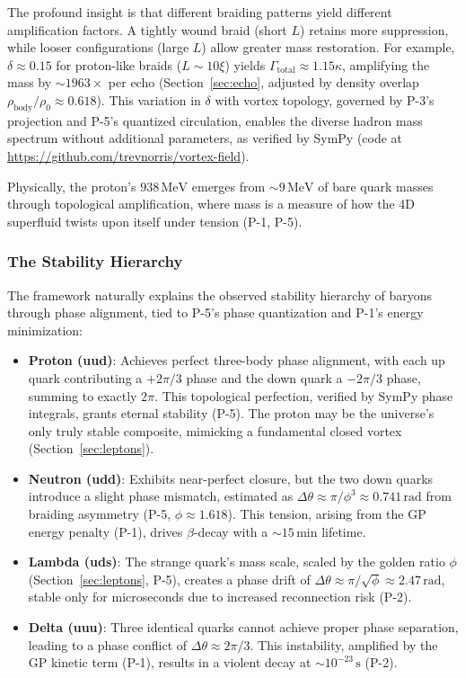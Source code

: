 The profound insight is that different braiding patterns yield different amplification factors. A tightly wound braid (short $L$) retains more suppression, while looser configurations (large $L$) allow greater mass restoration. For example, $\delta \approx 0.15$ for proton-like braids ($L \sim 10 \xi$) yields $\Gamma_{\text{total}} \approx 1.15 \kappa$, amplifying the mass by $\sim 1963\times$ per echo (Section~\ref{sec:echo}, adjusted by density overlap $\rho_{\text{body}} / \rho_0 \approx 0.618$). This variation in $\delta$ with vortex topology, governed by P-3's projection and P-5's quantized circulation, enables the diverse hadron mass spectrum without additional parameters, as verified by SymPy (code at \url{https://github.com/trevnorris/vortex-field}).

Physically, the proton's $938 \, \text{MeV}$ emerges from $\sim 9 \, \text{MeV}$ of bare quark masses through topological amplification, where mass is a measure of how the 4D superfluid twists upon itself under tension (P-1, P-5).

\subsubsection{The Stability Hierarchy}

The framework naturally explains the observed stability hierarchy of baryons through phase alignment, tied to P-5's phase quantization and P-1's energy minimization:

\begin{itemize}
\item \textbf{Proton (uud)}: Achieves perfect three-body phase alignment, with each up quark contributing a $+2\pi/3$ phase and the down quark a $-2\pi/3$ phase, summing to exactly $2\pi$. This topological perfection, verified by SymPy phase integrals, grants eternal stability (P-5). The proton may be the universe's only truly stable composite, mimicking a fundamental closed vortex (Section~\ref{sec:leptons}).
\item \textbf{Neutron (udd)}: Exhibits near-perfect closure, but the two down quarks introduce a slight phase mismatch, estimated as $\Delta \theta \approx \pi / \phi^3 \approx 0.741 \, \text{rad}$ from braiding asymmetry (P-5, $\phi \approx 1.618$). This tension, arising from the GP energy penalty (P-1), drives $\beta$-decay with a $\sim 15 \, \text{min}$ lifetime.
\item \textbf{Lambda (uds)}: The strange quark's mass scale, scaled by the golden ratio $\phi$ (Section~\ref{sec:leptons}, P-5), creates a phase drift of $\Delta \theta \approx \pi / \sqrt{\phi} \approx 2.47 \, \text{rad}$, stable only for microseconds due to increased reconnection risk (P-2).
\item \textbf{Delta (uuu)}: Three identical quarks cannot achieve proper phase separation, leading to a phase conflict of $\Delta \theta \approx 2\pi/3$. This instability, amplified by the GP kinetic term (P-1), results in a violent decay at $\sim 10^{-23} \, \text{s}$ (P-2).
\end{itemize}

